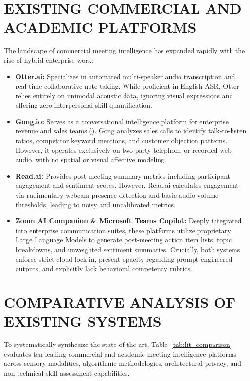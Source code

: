 \documentclass[12pt,a4paper,oneside]{report}
\providecommand{\parencite}[1]{(\cite{#1})}
\begin{document}
\section{EXISTING COMMERCIAL AND ACADEMIC PLATFORMS}
The landscape of commercial meeting intelligence has expanded rapidly with the rise of hybrid enterprise work:
\begin{itemize}
    \item \textbf{Otter.ai:} Specializes in automated multi-speaker audio transcription and real-time collaborative note-taking. While proficient in English ASR, Otter relies entirely on unimodal acoustic data, ignoring visual expressions and offering zero interpersonal skill quantification.
    \item \textbf{Gong.io:} Serves as a conversational intelligence platform for enterprise revenue and sales teams \parencite{gong2021revenue}. Gong analyzes sales calls to identify talk-to-listen ratios, competitor keyword mentions, and customer objection patterns. However, it operates exclusively on two-party telephone or recorded web audio, with no spatial or visual affective modeling.
    \item \textbf{Read.ai:} Provides post-meeting summary metrics including participant engagement and sentiment scores. However, Read.ai calculates engagement via rudimentary webcam presence detection and basic audio volume thresholds, leading to noisy and uncalibrated metrics.
    \item \textbf{Zoom AI Companion \& Microsoft Teams Copilot:} Deeply integrated into enterprise communication suites, these platforms utilize proprietary Large Language Models to generate post-meeting action item lists, topic breakdowns, and unweighted sentiment summaries. Crucially, both systems enforce strict cloud lock-in, present opacity regarding prompt-engineered outputs, and explicitly lack behavioral competency rubrics.
\end{itemize}

\section{COMPARATIVE ANALYSIS OF EXISTING SYSTEMS}
To systematically synthesize the state of the art, Table~\ref{tab:lit_comparison} evaluates ten leading commercial and academic meeting intelligence platforms across sensory modalities, algorithmic methodologies, architectural privacy, and non-technical skill assessment capabilities.
\end{document}
